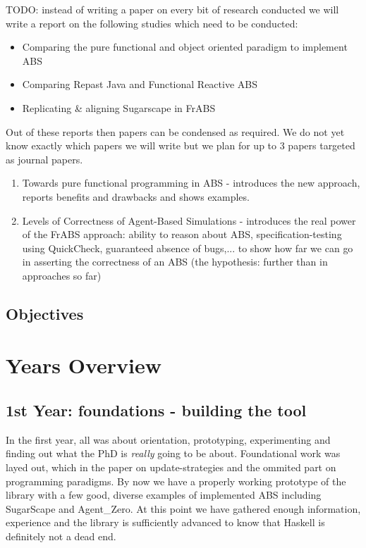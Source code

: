 TODO:
instead of writing a paper on every bit of research conducted we will write a report on the following studies which need to be conducted:

\begin{itemize}
	\item Comparing the pure functional and object oriented paradigm to implement ABS
	\item Comparing Repast Java and Functional Reactive ABS
	\item Replicating \& aligning Sugarscape in FrABS 
\end{itemize}

Out of these reports then papers can be condensed as required. We do not yet know exactly which papers we will write but we plan for up to 3 papers targeted as journal papers.

\begin{enumerate}
	\item Towards pure functional programming in ABS - introduces the new approach, reports benefits and drawbacks and shows examples.
	\item Levels of Correctness of Agent-Based Simulations - introduces the real power of the FrABS approach: ability to reason about ABS, specification-testing using QuickCheck, guaranteed absence of bugs,... to show how far we can go in asserting the correctness of an ABS (the hypothesis: further than in approaches so far)
\end{enumerate}

\subsection{Objectives}


\section{Years Overview}

\subsection{1st Year: foundations - building the tool}
In the first year, all was about orientation, prototyping, experimenting and finding out what the PhD is \textit{really} going to be about. Foundational work was layed out, which in the paper on update-strategies and the ommited part on programming paradigms. By now we have a properly working prototype of the library with a few good, diverse examples of implemented ABS including SugarScape and Agent\_Zero. At this point we have gathered enough information, experience and the library is sufficiently advanced to know that Haskell is definitely not a dead end.

